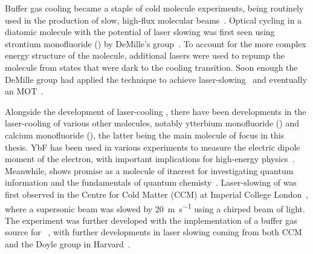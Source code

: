 Buffer gas cooling became a staple of cold molecule experiments, being
routinely used in the production of slow, high-flux molecular
beams~\cite{Maxwell2005, Barry2011}.
Optical cycling in a diatomic molecule with the potential of laser slowing was
first seen using strontium monofluoride (\SrF{}) by DeMille's
group~\cite{Shuman2009}. To account for the more complex energy structure of
the molecule, additional lasers were used to repump the molecule from states
that were dark to the cooling transition.
Soon enough the DeMille group had applied the technique to achieve
laser-slowing~\cite{PhysRevLett.108.103002} and eventually an \SrF{}
MOT~\cite{Barry2014, PhysRevLett.116.063004}. 

Alongside the development of laser-cooling \SrF{}, there have been developments
in the laser-cooling of various other molecules, notably ytterbium monofluoride
(\YbF{}) and calcium monofluoride (\CaF{}), the latter being the main molecule
of focus in this thesis. YbF has been used in various experiments to measure
the electric dipole moment of the electron, with important implications for
high-energy physics~\cite{}. Meanwhile, \CaF{} shows promise as a molecule of
itnerest for investigating quantum information and the fundamentals of quantum
chemisty~\cite{}. Laser-slowing of \CaF{} was first observed in the Centre for
Cold Matter (CCM) at Imperial College London~\cite{PhysRevA.89.053416}, where a
supersonic beam was slowed by \SI{20}{\meter\per\second} using a chirped beam of
light. The \CaF{} experiment was further developed with the implementation of a
buffer gas source for \CaF{}~\cite{Truppe2018}, with further developments in
laser slowing coming from both CCM~\cite{Truppe2017a} and the Doyle group in
Harvard~\cite{0953-4075-49-17-174001}.

